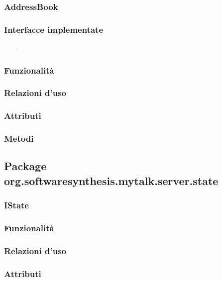 \subsubsection{AddressBook}\label{sec:addressbook}

\subsubsection*{Interfacce implementate}
\begin{itemize}[noitemsep,nolistsep]
  \item[-]
\end{itemize}

\subsubsection*{Funzionalità}

\subsubsection*{Relazioni d'uso}

\subsubsection*{Attributi}

\subsubsection*{Metodi}

\subsection{Package org.softwaresynthesis.mytalk.server.state}\label{sec:state}

\subsubsection{IState}\label{sec:istate}

\subsubsection*{Funzionalità}

\subsubsection*{Relazioni d'uso}

\subsubsection*{Attributi}

